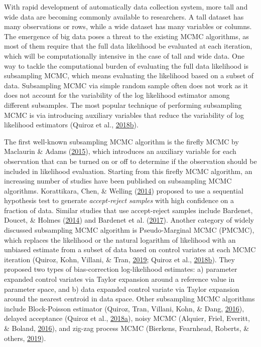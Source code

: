 \documentclass[12pt]{book}
\numberwithin{equation}{chapter}
\begin{document}
With rapid development of automatically data collection system, more tall and wide data are becoming commonly available to researchers. A tall dataset has many observations or rows, while a wide dataset has many variables or columns. The emergence of big data poses a threat to the existing MCMC algorithms, as most of them require that the full data likelihood be evaluated at each iteration, which will be computationally intensive in the case of tall and wide data. One way to tackle the computational burden of evaluating the full data likelihood is subsampling MCMC, which means evaluating the likelihood based on a subset of data. Subsampling MCMC via simple random sample often does not work as it does not account for the variability of the log likelihood estimator among different subsamples. The most popular technique of performing subsampling MCMC is via introducing auxiliary variables that reduce the variability of log likelihood estimators (Quiroz et al., \protect\hyperlink{ref-quiroz2018subsampling}{2018}\protect\hyperlink{ref-quiroz2018subsampling}{b}).

The first well-known subsampling MCMC algorithm is the firefly MCMC by Maclaurin \& Adams (\protect\hyperlink{ref-maclaurin2015firefly}{2015}), which introduces an auxiliary variable for each observation that can be turned on or off to determine if the observation should be included in likelihood evaluation. Starting from this firefly MCMC algorithm, an increasing number of studies have been published on subsampling MCMC algorithms. Korattikara, Chen, \& Welling (\protect\hyperlink{ref-korattikara2014austerity}{2014}) proposed to use a sequential hypothesis test to generate \emph{accept-reject samples} with high confidence on a fraction of data. Similar studies that use accept-reject samples include Bardenet, Doucet, \& Holmes (\protect\hyperlink{ref-bardenet2014towards}{2014}) and Bardenet et al. (\protect\hyperlink{ref-bardenet2017markov}{2017}). Another category of widely discussed subsampling MCMC algorithm is Pseudo-Marginal MCMC (PMCMC), which replaces the likelihood or the natural logarithm of likelihood with an unbiased estimate from a subset of data based on control variates at each MCMC iteration (Quiroz, Kohn, Villani, \& Tran, \protect\hyperlink{ref-quiroz2019speeding}{2019}; Quiroz et al., \protect\hyperlink{ref-quiroz2018subsampling}{2018}\protect\hyperlink{ref-quiroz2018subsampling}{b}). They proposed two types of bias-correction log-likelihood estimates: a) parameter expanded control variates via Taylor expansion around a reference value in parameter space, and b) data expanded control variate via Taylor expansion around the nearest centroid in data space. Other subsampling MCMC algorithms include Block-Poisson estimator (Quiroz, Tran, Villani, Kohn, \& Dang, \protect\hyperlink{ref-quiroz2016block}{2016}), delayed acceptance (Quiroz et al., \protect\hyperlink{ref-quiroz2018speeding}{2018}\protect\hyperlink{ref-quiroz2018speeding}{a}), noisy MCMC (Alquier, Friel, Everitt, \& Boland, \protect\hyperlink{ref-alquier2016noisy}{2016}), and zig-zag process MCMC (Bierkens, Fearnhead, Roberts, \& others, \protect\hyperlink{ref-bierkens2019zig}{2019}).
\end{document}
